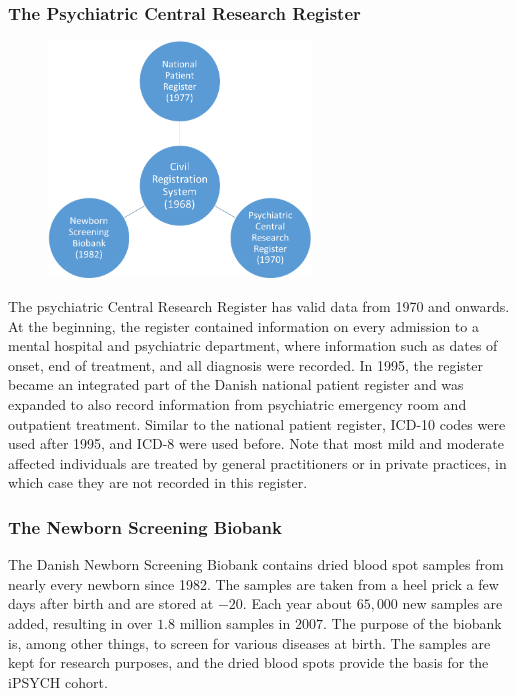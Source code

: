 \subsubsection{The Psychiatric Central Research Register}
\begin{figure}
	\includegraphics[width=7cm]{intro/registers.png}
	\label{fig:registerBubbles}
\end{figure}

The psychiatric Central Research Register has valid data from 1970 and onwards. At the beginning, the register contained information on every admission to a mental hospital and psychiatric department, where information such as dates of onset, end of treatment, and all diagnosis were recorded. In 1995, the register became an integrated part of the Danish national patient register and was expanded to also record information from psychiatric emergency room and outpatient treatment. Similar to the national patient register, ICD-10 codes were used after 1995, and ICD-8 were used before. Note that most mild and moderate affected individuals are treated by general practitioners or in private practices, in which case they are not recorded in this register.\cite{mors2011danish}


\subsubsection{The Newborn Screening Biobank}
The Danish Newborn Screening Biobank contains dried blood spot samples from nearly every newborn since 1982. The samples are taken from a heel prick a few days after birth and are stored at $ -20 $\textcelsius. Each year about $ 65,000 $ new samples are added, resulting in over $ 1.8 $ million samples in $ 2007 $. The purpose of the biobank is, among other things, to screen for various diseases at birth. The samples are kept for research purposes, and the dried blood spots provide the basis for the iPSYCH cohort\cite{norgaard2007storage}.

